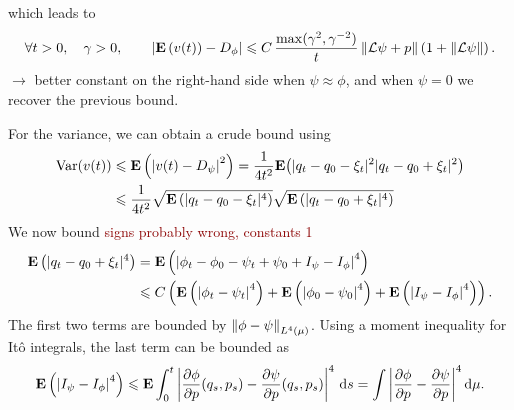 \documentclass[11pt,a4paper]{article}
\newcommand{\expect}[0]{\mathbf{E}}
\renewcommand{\d}{\mathrm d}
\newcommand{\red}[1]{\textcolor{darkred}{#1}}
\theoremstyle{plain}
\numberwithin{equation}{section}
\renewcommand{\leq}{\leqslant}
\begin{document}
which leads to
\begin{align*}
    \forall t > 0, \quad \gamma > 0, \qquad
    \abs{\expect \left( v(t) \right) - D_{\phi}}
    \leq C \, \frac{\max(\gamma^2, \gamma^{-2})}{t} \norm{\mathcal L\psi + p}  \left(1 + \norm{\mathcal L \psi} \right).
\end{align*}
$\rightarrow$ better constant on the right-hand side when $\psi \approx \phi$,
and when $\psi = 0$ we recover the previous bound.

\newpage
For the variance, we can obtain a crude bound using
\begin{align*}
    \mathrm{Var} (v(t))
    &\leq \expect \left( \abs{v(t) - D_{\psi}}^2 \right)
    = \frac{1}{4 t^2} \expect \big( |q_t - q_0 - \xi_t|^2 |q_t - q_0 + \xi_t|^2 \big) \\
    &\leq \frac{1}{4 t^2} \sqrt{\expect \left(  |q_t - q_0 - \xi_t|^4 \right)} \sqrt{\expect \left( |q_t - q_0 + \xi_t|^4 \right)}
\end{align*}
We now bound \red{signs probably wrong, constants 1}
\begin{align*}
    \expect \left( |q_t - q_0 + \xi_t|^4 \right)
    &= \expect \left( \abs{\phi_t - \phi_0 - \psi_t + \psi_0 + I_{\psi} - I_{\phi}}^4 \right) \\
    &\leq C \left( \expect \left( \abs{\phi_t - \psi_t}^4 \right) + \expect \left( \abs{\phi_0 - \psi_0}^4 \right) + \expect \left( \abs{I_{\psi} - I_{\phi}}^4 \right) \right).
\end{align*}
The first two terms are bounded by $\norm{\phi - \psi}_{L^4(\mu)}$.
Using a moment inequality for It\^o integrals, the last term can be bounded as
\[
    \expect \left( \abs{I_{\psi} - I_{\phi}}^4 \right) \leq \expect \int_{0}^{t} \abs{\derivative{1}[\phi]{p}(q_s, p_s) - \derivative{1}[\psi]{p}(q_s, p_s)}^4 \, \d s = \int \abs{\derivative{1}[\phi]{p} - \derivative{1}[\psi]{p}}^4 \d \mu.
\]
\end{document}
